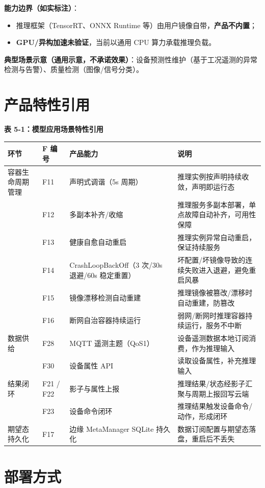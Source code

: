 \textbf{能力边界（如实标注）}：

\begin{itemize}
  \item 推理框架（TensorRT、ONNX Runtime 等）由用户镜像自带，\textbf{产品不内置}；
  \item \textbf{GPU/异构加速未验证}，当前以通用 CPU 算力承载推理负载。
\end{itemize}

\textbf{典型场景示意（通用示意，不承诺效果）}：设备预测性维护（基于工况遥测的异常检测与告警）、质量检测（图像/信号分类）。

\section{产品特性引用}

\textbf{表 5-1：模型应用场景特性引用}

{\small\setlength{\tabcolsep}{3pt}
\begin{tabular}{@{}p{1.6cm}p{0.8cm}p{3.4cm}p{8.8cm}@{}}
\toprule
环节 & F 编号 & 产品能力 & 说明\\
\midrule
容器生命周期管理 & F11 & 声明式调谐（5s 周期） & 推理实例按声明持续收敛，声明即运行态\\
 & F12 & 多副本补齐/收缩 & 推理服务多副本部署，单点故障自动补齐，可用性保障\\
 & F13 & 健康自愈自动重启 & 推理实例异常自动重启，保证持续服务\\
 & F14 & CrashLoopBackOff（3 次/30s 退避/60s 稳定重置） & 坏配置/坏镜像导致的连续失败进入退避，避免重启风暴\\
 & F15 & 镜像漂移检测自动重建 & 推理镜像被篡改/漂移时自动重建，防篡改\\
 & F16 & 断网自治容器持续运行 & 弱网/断网时推理容器持续运行，服务不中断\\
数据供给 & F28 & MQTT 遥测主题（QoS1） & 设备遥测数据本地订阅消费，作为推理输入\\
 & F30 & 设备属性 API & 读取设备属性，补充推理输入\\
结果闭环 & F21 / F22 & 影子与属性上报 & 推理结果/状态经影子汇聚与周期上报回写云端\\
 & F23 & 设备命令闭环 & 推理结果触发设备命令/动作，形成闭环\\
期望态持久化 & F17 & 边缘 MetaManager SQLite 持久化 & 数据订阅配置与期望态落盘，重启后不丢失\\
\bottomrule
\end{tabular}}

\section{部署方式}

